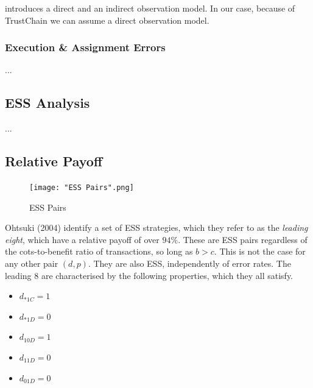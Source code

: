 \documentclass[11pt,a4paper]{report}
\theoremstyle{definition}
\theoremstyle{theorem}
\theoremstyle{proposition}
\theoremstyle{corollary}
\theoremstyle{lemma}
\theoremstyle{example}
\theoremstyle{remark}
\begin{document}
\noindent{} \cite{How Should we Define Goodness} introduces a direct and an indirect observation model. In our case, because of TrustChain we can assume a direct observation model. 

\subsubsection{Execution \& Assignment Errors}
\label{subsubsec:Execution & Assignment Errors}
...
\subsection{ESS Analysis}
\label{subsec:ESS Analysis}
...
\subsection{Relative Payoff}
\label{subsec:Relative Payoff}

{\centering
\begin{figure}[H]
\begin{center}
\texttt{[image: "ESS Pairs".png]}
\end{center}
\label{fig:ESS Pairs}
\caption{ESS Pairs}
\end{figure}
}

Ohtsuki (2004) identify a set of ESS strategies, which they refer to as the {\it leading eight}, which have a relative payoff of over $94\%$. These are ESS pairs regardless of the cots-to-benefit ratio of transactions, so long as $b>c$. This is not the case for any other pair $(d,p).$ They are also ESS, independently of error rates. The leading 8 are characterised by the following properties, which they all satisfy.
\begin{itemize}
\item $d_{*1C}=1$ 
\item $d_{*1D}=0$
\item $d_{10D}=1$
\item $d_{11D}=0$
\item $d_{01D}=0$
\end{itemize}
\end{document}
